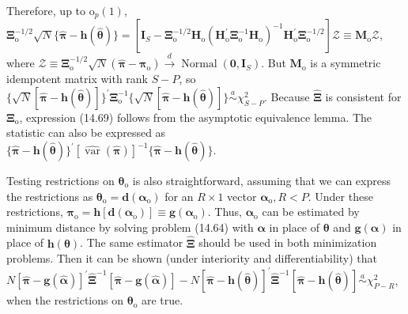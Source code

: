 \documentclass[10pt]{article}
\begin{document}
Therefore, up to $\mathrm{o}_{p}(1)$,\\
$\boldsymbol{\Xi}_{\mathrm{o}}^{-1 / 2} \sqrt{N}\{\hat{\boldsymbol{\pi}}-\mathbf{h}(\hat{\boldsymbol{\theta}})\}=\left[\mathbf{I}_{S}-\boldsymbol{\Xi}_{\mathrm{o}}^{-1 / 2} \mathbf{H}_{\mathrm{o}}\left(\mathbf{H}_{\mathrm{o}}^{\prime} \boldsymbol{\Xi}_{\mathrm{o}}^{-1} \mathbf{H}_{\mathrm{o}}\right)^{-1} \mathbf{H}_{\mathrm{o}}^{\prime} \boldsymbol{\Xi}_{\mathrm{o}}^{-1 / 2}\right] \mathscr{Z} \equiv \mathbf{M}_{\mathrm{o}} \mathscr{Z}$, where $\mathscr{Z} \equiv \boldsymbol{\Xi}_{\mathrm{o}}^{-1 / 2} \sqrt{N}\left(\hat{\boldsymbol{\pi}}-\boldsymbol{\pi}_{\mathrm{o}}\right) \xrightarrow{d} \operatorname{Normal}\left(\mathbf{0}, \mathbf{I}_{S}\right)$. But $\mathbf{M}_{\mathrm{o}}$ is a symmetric idempotent matrix with rank $S-P$, so $\{\sqrt{N}[\hat{\boldsymbol{\pi}}-\mathbf{h}(\hat{\boldsymbol{\theta}})]\}^{\prime} \boldsymbol{\Xi}_{\mathrm{o}}^{-1}\{\sqrt{N}[\hat{\boldsymbol{\pi}}-\mathbf{h}(\hat{\boldsymbol{\theta}})]\} \stackrel{a}{\sim} \chi_{S-P}^{2}$. Because $\hat{\boldsymbol{\Xi}}$ is consistent for $\boldsymbol{\Xi}_{\mathrm{o}}$, expression (14.69) follows from the asymptotic equivalence lemma. The statistic can also be expressed as\\
$\{\hat{\boldsymbol{\pi}}-\mathbf{h}(\hat{\boldsymbol{\theta}})\}^{\prime}[\widehat{\operatorname{var}}(\hat{\boldsymbol{\pi}})]^{-1}\{\hat{\boldsymbol{\pi}}-\mathbf{h}(\hat{\boldsymbol{\theta}})\}$.

Testing restrictions on $\boldsymbol{\theta}_{\mathrm{o}}$ is also straightforward, assuming that we can express the restrictions as $\boldsymbol{\theta}_{\mathrm{o}}=\mathbf{d}\left(\boldsymbol{\alpha}_{\mathrm{o}}\right)$ for an $R \times 1$ vector $\boldsymbol{\alpha}_{\mathrm{o}}, R<P$. Under these restrictions, $\boldsymbol{\pi}_{\mathrm{o}}=\mathbf{h}\left[\mathbf{d}\left(\boldsymbol{\alpha}_{\mathrm{o}}\right)\right] \equiv \mathbf{g}\left(\boldsymbol{\alpha}_{\mathrm{o}}\right)$. Thus, $\boldsymbol{\alpha}_{\mathrm{o}}$ can be estimated by minimum distance by solving problem (14.64) with $\boldsymbol{\alpha}$ in place of $\boldsymbol{\theta}$ and $\mathbf{g}(\boldsymbol{\alpha})$ in place of $\mathbf{h}(\boldsymbol{\theta})$. The same estimator $\hat{\boldsymbol{\Xi}}$ should be used in both minimization problems. Then it can be shown (under interiority and differentiability) that\\
$N[\hat{\boldsymbol{\pi}}-\mathbf{g}(\hat{\boldsymbol{\alpha}})]^{\prime} \hat{\boldsymbol{\Xi}}^{-1}[\hat{\boldsymbol{\pi}}-\mathbf{g}(\hat{\boldsymbol{\alpha}})]-N[\hat{\boldsymbol{\pi}}-\mathbf{h}(\hat{\boldsymbol{\theta}})]^{\prime} \hat{\boldsymbol{\Xi}}^{-1}[\hat{\boldsymbol{\pi}}-\mathbf{h}(\hat{\boldsymbol{\theta}})] \stackrel{a}{\sim} \chi_{P-R}^{2}$,\\
when the restrictions on $\boldsymbol{\theta}_{\mathrm{o}}$ are true.
\end{document}
